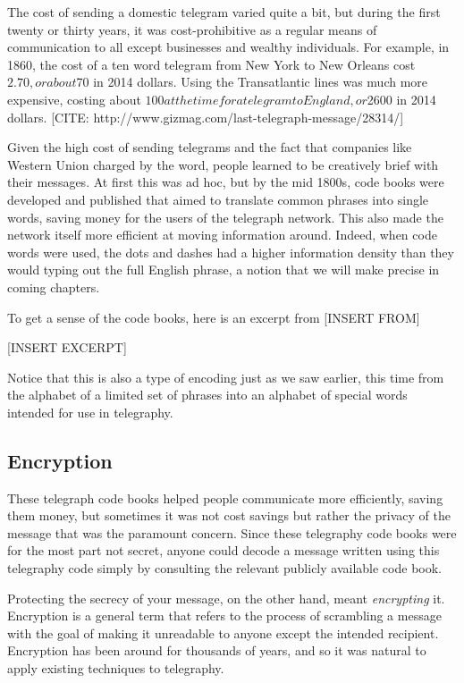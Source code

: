 \documentclass[UTF8]{book}
\begin{document}
\begin{CJK}{UTF8}{gbsn}
The cost of sending a domestic telegram varied quite a bit, but during the first twenty or thirty years, it was cost-prohibitive as a regular means of communication to all except businesses and wealthy individuals. For example, in 1860, the cost of a ten word telegram from New York to New Orleans cost $2.70, or about $70 in 2014 dollars. Using the Transatlantic lines was much more expensive, costing about $100 at the time for a telegram to England, or $2600 in 2014 dollars. [CITE: http://www.gizmag.com/last-telegraph-message/28314/]

Given the high cost of sending telegrams and the fact that companies like Western Union charged by the word, people learned to be creatively brief with their messages. At first this was ad hoc, but by the mid 1800s, code books were developed and published that aimed to translate common phrases into single words, saving money for the users of the telegraph network. This also made the network itself more efficient at moving information around. Indeed, when code words were used, the dots and dashes had a higher information density than they would typing out the full English phrase, a notion that we will make precise in coming chapters.

To get a sense of the code books, here is an excerpt from  [INSERT FROM]

[INSERT EXCERPT]

Notice that this is also a type of encoding just as we saw earlier, this time from the alphabet of a limited set of phrases into an alphabet of special words intended for use in telegraphy.

\subsection{Encryption}

These telegraph code books helped people communicate more efficiently, saving them money, but sometimes it was not cost savings but rather the privacy of the message that was the paramount concern. Since these telegraphy code books were for the most part not secret, anyone could decode a message written using this telegraphy code simply by consulting the relevant publicly available code book.

Protecting the secrecy of your message, on the other hand, meant \emph{encrypting} it. Encryption is a general term that refers to the process of scrambling a message with the goal of making it unreadable to anyone except the intended recipient. Encryption has been around for thousands of years, and so it was natural to apply existing techniques to telegraphy.


\end{CJK}
\end{document}
